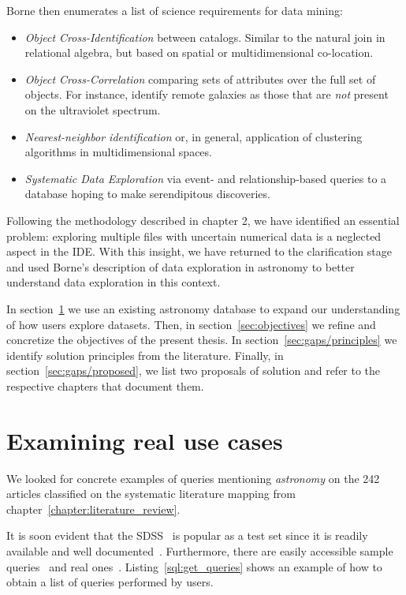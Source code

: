 Borne then enumerates a list of science requirements for data mining:

\begin{itemize}
    \item \emph{Object Cross-Identification} between catalogs. Similar to the natural join
        in relational algebra, but based on spatial or multidimensional co-location.
    \item \emph{Object Cross-Correlation} comparing sets of attributes over the full set of objects.
        For instance, identify remote galaxies as those that are \emph{not} present on
        the ultraviolet spectrum.
    \item \emph{Nearest-neighbor identification} or, in general, application of clustering
        algorithms in multidimensional spaces.
    \item \emph{Systematic Data Exploration} via event- and relationship-based queries to a database
        hoping to make serendipitous discoveries.
\end{itemize}

Following the methodology described in chapter 2, we have identified an essential problem:
exploring multiple files with uncertain numerical data is a neglected aspect in the \gls{IDE}.
With this insight, we have returned to the clarification stage and used Borne's description
of data exploration in astronomy to better understand data exploration in
this context.


In section~\ref{sec:real_use_cases} we use an existing astronomy database
to expand our understanding of how users explore datasets. Then,
in section~\ref{sec:objectives} we refine and concretize the objectives
of the present thesis. In section~\ref{sec:gaps/principles} we identify
solution principles from the literature. Finally, in
section~\ref{sec:gaps/proposed}, we list two proposals of solution and refer
to the respective chapters that document them.

\section{Examining real use cases}
\label{sec:real_use_cases}

We looked for concrete examples of queries mentioning \emph{astronomy} on the
242 articles classified on the systematic literature mapping from
chapter~\ref{chapter:literature_review}.

It is soon evident that the \gls{SDSS}~\cite{SDSS14} is popular as a test
set since it is readily available and well documented~\cite{Gray2002}.
Furthermore, there are easily accessible sample queries~\cite{SDSSSamples}
and real ones~\cite{SDSSSqlLogs}.
Listing~\ref{sql:get_queries} shows an example of how to obtain a list
of queries performed by users.


